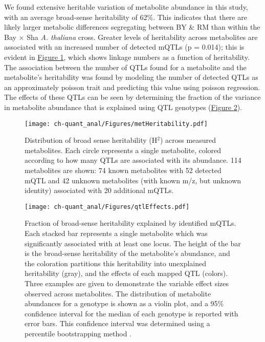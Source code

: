 We found extensive heritable variation of metabolite abundance in this study, with an average broad-sense heritability of 62\%.  This indicates that there are likely larger metabolic differences segregating between BY \& RM than within the Bay $\times$ Sha \textit{A. thaliana} cross. Greater levels of heritability across metabolites are associated with an increased number of detected mQTLs (p = 0.014); this is evident in \hyperref[ch-quant_anal:metHeritability]{Figure \ref{ch-quant_anal:metHeritability}}, which shows linkage numbers as a function of heritability. The association between the number of QTLs found for a metabolite and the metabolite's heritability was found by modeling the number of detected QTLs as an approximately poisson trait and predicting this value using poisson regression. The effects of these QTLs can be seen by determining the fraction of the variance in metabolite abundance that is explained using QTL genotypes (\hyperref[ch-quant_anal:qtlEffects]{Figure \ref{ch-quant_anal:qtlEffects}}).

\begin{figure}[h!]
\begin{center}
\texttt{[image: ch-quant\_anal/Figures/metHeritability.pdf]}
\caption[Distribution of broad sense heritability (H$^{2}$) across measured metabolites]{Distribution of broad sense heritability (H$^{2}$) across measured metabolites. Each circle represents a single metabolite, colored according to how many QTLs are associated with its abundance.  114 metabolites are shown: 74 known metabolites with 52 detected mQTL and 42 unknown metabolites (with known m/z, but unknown identity) associated with 20 additional mQTLs.}
\label{ch-quant_anal:metHeritability}
\end{center}
\end{figure}

\begin{figure}[h!]
\begin{center}
\texttt{[image: ch-quant\_anal/Figures/qtlEffects.pdf]}
\caption[Fraction of broad-sense heritability explained by identified mQTLs]{Fraction of broad-sense heritability explained by identified mQTLs.  Each stacked bar represents a single metabolite which was significantly associated with at least one locus.  The height of the bar is the broad-sense heritability of the metabolite's abundance, and the coloration partitions this heritability into unexplained heritability (gray), and the effects of each mapped QTL (colors).  Three examples are given to demonstrate the variable effect sizes observed across metabolites.  The distribution of metabolite abundances for a genotype is shown as a violin plot, and a 95\% confidence interval for the median of each genotype is reported with error bars.  This confidence interval was determined using a percentile bootstrapping method \cite{Davison:1997vn}.}
\label{ch-quant_anal:qtlEffects}
\end{center}
\end{figure}

